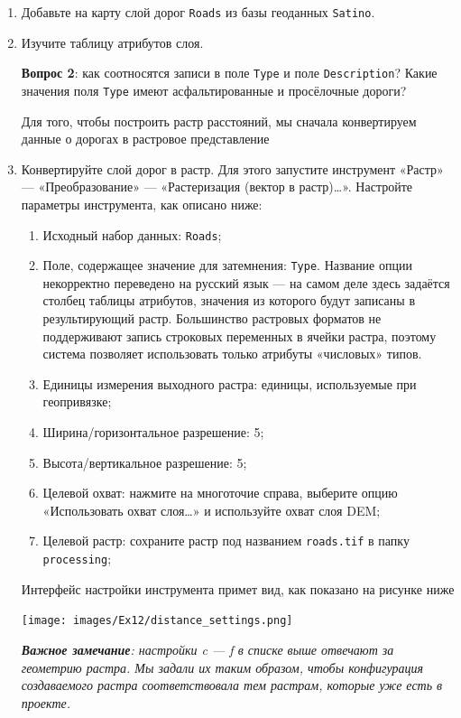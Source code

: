 \documentclass[
  12pt,
]{book}
\begin{document}
\begin{enumerate}
\def\labelenumi{\arabic{enumi}.}
\item
  Добавьте на карту слой дорог \texttt{Roads} из базы геоданных \texttt{Satino}.
\item
  Изучите таблицу атрибутов слоя.

  \textbf{Вопрос 2}: как соотносятся записи в поле \texttt{Type} и поле \texttt{Description}? Какие значения поля \texttt{Type} имеют асфальтированные и просёлочные дороги?

  Для того, чтобы построить растр расстояний, мы сначала конвертируем данные о дорогах в растровое представление
\item
  Конвертируйте слой дорог в растр. Для этого запустите инструмент «Растр» --- «Преобразование» --- «Растеризация (вектор в растр)\ldots». Настройте параметры инструмента, как описано ниже:

  \begin{enumerate}
  \def\labelenumii{\alph{enumii}.}
  \item
    Исходный набор данных: \texttt{Roads};
  \item
    Поле, содержащее значение для затемнения: \texttt{Type}. Название опции некорректно переведено на русский язык --- на самом деле здесь задаётся столбец таблицы атрибутов, значения из которого будут записаны в результирующий растр. Большинство растровых форматов не поддерживают запись строковых переменных в ячейки растра, поэтому система позволяет использовать только атрибуты «числовых» типов.
  \item
    Единицы измерения выходного растра: единицы, используемые при геопривязке;
  \item
    Ширина/горизонтальное разрешение: 5;
  \item
    Высота/вертикальное разрешение: 5;
  \item
    Целевой охват: нажмите на многоточие справа, выберите опцию «Использовать охват слоя\ldots» и используйте охват слоя DEM;
  \item
    Целевой растр: сохраните растр под названием \texttt{roads.tif} в папку \texttt{processing};
  \end{enumerate}

  Интерфейс настройки инструмента примет вид, как показано на рисунке ниже

  \texttt{[image: images/Ex12/distance\_settings.png]}

  \emph{\textbf{Важное замечание}: настройки c --- f в списке выше отвечают за геометрию растра. Мы задали их таким образом, чтобы конфигурация создаваемого растра соответствовала тем растрам, которые уже есть в проекте.}


\end{enumerate}
\end{document}
